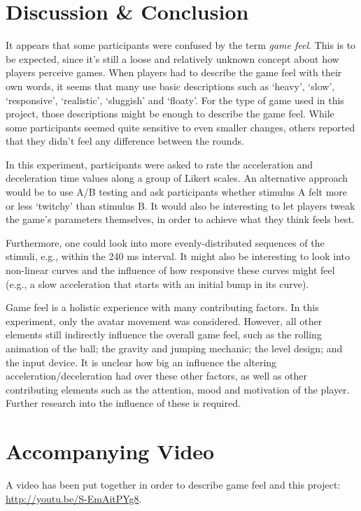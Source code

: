 \section{Discussion \& Conclusion} \label{discussion}
It appears that some participants were confused by the term \textit{game feel}. This is to be expected, since it's still a loose and relatively unknown concept about how players perceive games. When players had to describe the game feel with their own words, it seems that many use basic descriptions such as `heavy', `slow', `responsive', `realistic', `sluggish' and `floaty'. For the type of game used in this project, those descriptions might be enough to describe the game feel. While some participants seemed quite sensitive to even smaller changes, others reported that they didn't feel any difference between the rounds.

In this experiment, participants were asked to rate the acceleration and deceleration time values along a group of Likert scales. An alternative approach would be to use A/B testing and ask participants whether stimulus A felt more or less `twitchy' than stimulus B. It would also be interesting to let players tweak the game's parameters themselves, in order to achieve what they think feels best.

Furthermore, one could look into more evenly-distributed sequences of the stimuli, e.g., within the 240 ms interval. It might also be interesting to look into non-linear curves and the influence of how responsive these curves might feel (e.g., a slow acceleration that starts with an initial bump in its curve).


Game feel is a holistic experience with many contributing factors. In this experiment, only the avatar movement was considered. However, all other elements still indirectly influence the overall game feel, such as the rolling animation of the ball; the gravity and jumping mechanic; the level design; and the input device. It is unclear how big an influence the altering acceleration/deceleration had over these other factors, as well as other contributing elements such as the attention, mood and motivation of the player. Further research into the influence of these is required.

\section{Accompanying Video}
A video has been put together in order to describe game feel and this project: \url{http://youtu.be/S-EmAitPYg8}.